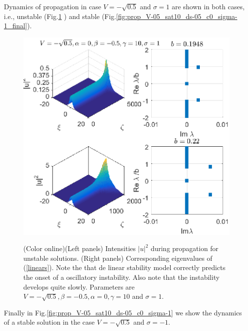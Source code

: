 \documentclass[aps,pre,showpacs,twocolumn]{revtex4}
\begin{document}
Dynamics of propagation in case $V=-\sqrt{0.5}$ and $\sigma=1$ are shown in both cases, i.e., unstable (Fig.\ref{fig:prop_V-05_sat10_ds-05_c0_sigma1} ) and  stable (Fig.\ref{fig:prop_V-05_sat10_ds-05_c0_sigma-1_final}).
\begin{figure}[ht]
\begin{center}
\scalebox{.75} {\includegraphics{prop_V-05_sat10_ds-05_c0_sigma1_final.eps}}
\end{center}
\caption{(Color online)(Left panels) Intensities $|u|^2$ during propagation for unstable solutions. (Right panels) Corresponding eigenvalues of (\ref{linears}). Note the that de linear stability model correctly predicts the onset of a oscillatory instability. Also note that the instability develops quite slowly. Parameters are $V=-\sqrt{0.5},\beta=-0.5,\alpha=0,\gamma=10$ and $\sigma=1$.}%
\label{fig:prop_V-05_sat10_ds-05_c0_sigma1}%
\end{figure}
Finally in Fig.\ref{fig:prop_V-05_sat10_ds-05_c0_sigma-1} we show the dynamics of a stable solution in the case $V=-\sqrt{0.5}$ and $\sigma=-1$.
\end{document}
